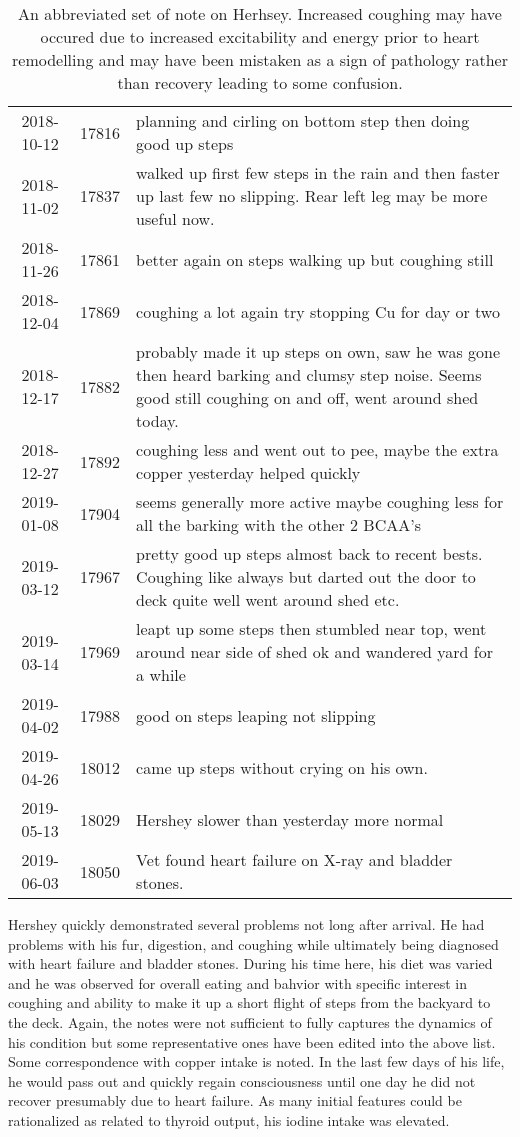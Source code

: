 \documentclass[aps,secnumarabic,balancelastpage,amsmath,amssymb,nofootinbib]{revtex4}
\begin{document}
\begin{table}[H]
\begin{tabular}{|c|r|p{4in}|}
2018-10-12 & 17816 &planning and cirling on bottom step then doing good up steps  \\
2018-11-02 & 17837 & walked up first few steps in the rain and then faster up last few no slipping. Rear left leg may be more useful now.  \\
2018-11-26 & 17861 & better again on steps walking up but coughing still  \\
2018-12-04 & 17869 &coughing a lot again try stopping Cu for day or two  \\
2018-12-17 & 17882 &probably made it up steps on own, saw he was gone then heard barking and clumsy step noise. Seems good still coughing on and off, went around shed today.  \\
2018-12-27 & 17892 &coughing less and went out to pee, maybe the extra copper yesterday helped quickly  \\
2019-01-08 & 17904 & seems generally more active maybe coughing less for all the barking with the other 2 BCAA's \\
2019-03-12 & 17967 & pretty good up steps almost back to recent bests. Coughing like always but darted out the door to deck quite well went around shed etc.  \\
2019-03-14 & 17969 &leapt up some steps then stumbled near top, went around near side of shed ok and wandered yard for a while  \\
2019-04-02 & 17988 &good on steps leaping not slipping  \\
2019-04-26 & 18012 &came up steps without crying on his own.  \\
2019-05-13 & 18029 & Hershey slower than yesterday more normal  \\
2019-06-03 & 18050 &Vet found heart failure on X-ray and bladder stones.   \\
\hline
\hline
\end{tabular}
\caption{ An abbreviated set of note on Herhsey. Increased coughing may have occured due to increased excitability and energy prior to heart remodelling and 
may have been mistaken as a sign of pathology rather than recovery leading
to some confusion. 
   }
\label{tab:hershey}
\end{table}

Hershey quickly demonstrated several problems not long after arrival.
He had problems with his fur, digestion, and coughing while ultimately
being diagnosed with heart failure and bladder stones.
During his time here, his diet was varied and he was observed
for overall eating and bahvior with specific interest in 
coughing and ability to make it up a short flight of steps
from the backyard to the deck. Again, the notes were not sufficient
to fully captures the dynamics of his condition but some representative
ones have been edited into the above list. Some correspondence with
copper intake is noted. In the last few days of his life, he
would pass out and quickly regain consciousness until one day 
he did not recover presumably due to heart failure. 
As many initial features could be rationalized as related to thyroid output,
his iodine intake was elevated. 
\end{document}
